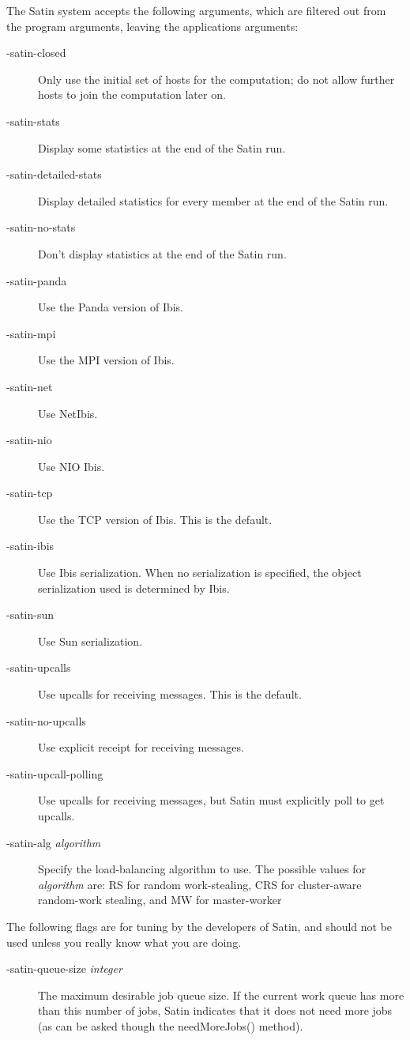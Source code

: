 \documentclass[10pt]{article}
\begin{document}
The Satin system accepts the following arguments, which are
filtered out from the program arguments, leaving the applications
arguments:
\begin{description}
\item[-satin-closed]
Only use the initial set of hosts for the computation; do not allow
further hosts to join the computation later on.
\item[-satin-stats]
Display some statistics at the end of the Satin run.
\item[-satin-detailed-stats]
Display detailed statistics for every member at the end of the Satin run.
\item[-satin-no-stats]
Don't display statistics at the end of the Satin run.
\item[-satin-panda]
Use the Panda version of Ibis.
\item[-satin-mpi]
Use the MPI version of Ibis.
\item[-satin-net]
Use NetIbis.
\item[-satin-nio]
Use NIO Ibis.
\item[-satin-tcp]
Use the TCP version of Ibis. This is the default.
\item[-satin-ibis]
Use Ibis serialization. When no serialization is specified,
the object serialization used is determined by Ibis.
\item[-satin-sun]
Use Sun serialization.
\item[-satin-upcalls]
Use upcalls for receiving messages. This is the default.
\item[-satin-no-upcalls]
Use explicit receipt for receiving messages.
\item[-satin-upcall-polling]
Use upcalls for receiving messages, but Satin must explicitly poll to get
upcalls.
\item[-satin-alg \emph{algorithm}]
Specify the load-balancing algorithm to use. The possible values for
\emph{algorithm} are: RS for random work-stealing, CRS for cluster-aware
random-work stealing, and MW for master-worker
\end{description}

The following flags are for tuning by the developers of Satin,
and should not be used unless you really know what you are doing.
\begin{description}
\item[-satin-queue-size \emph{integer}]
The maximum desirable job queue size. If the current work queue 
has more than this number of jobs, Satin indicates that 
it does not need more jobs (as can be asked though the
needMoreJobs() method).
\end{description}
\end{document}
